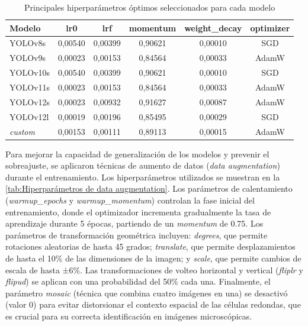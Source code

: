 \documentclass[12pt,a4paper,onecolumn,oneside]{report}
\begin{document}
\begin{table}[H]
\caption{Principales hiperparámetros óptimos seleccionados para cada modelo}
\label{tab:Principales hiperparámetros óptimos seleccionados para cada modelo}
\centering
\begin{tabular}{lccccc}
\toprule
\textbf{Modelo} & \textbf{lr0} & \textbf{lrf} & \textbf{momentum} & \textbf{weight\_decay} & \textbf{optimizer} \\
\midrule
YOLOv8s   & 0,00540 & 0,00399 & 0,90621 & 0,00010 & SGD \\
YOLOv9s   & 0,00023 & 0,00153 & 0,84564 & 0,00033 & AdamW \\
YOLOv10s  & 0,00540 & 0,00399 & 0,90621 & 0,00010 & SGD \\
YOLOv11s  & 0,00023 & 0,00153 & 0,84564 & 0,00033 & AdamW \\
YOLOv12s  & 0,00023 & 0,00932 & 0,91627 & 0,00087 & AdamW \\
YOLOv12l  & 0,00019 & 0,00196 & 0,85495 & 0,00029 & SGD \\
\textit{custom}    & 0,00153 & 0,00111 & 0,89113 & 0,00015 & AdamW \\
\bottomrule
\end{tabular}
\end{table}

Para mejorar la capacidad de generalización de los modelos y prevenir el sobreajuste, se aplicaron técnicas de aumento de datos (\textit{data augmentation}) 
durante el entrenamiento. Los hiperparámetros utilizados se muestran en la \autoref{tab:Hiperparámetros de data augmentation}. Los parámetros de calentamiento 
(\textit{warmup\_epochs} y \textit{warmup\_momentum}) controlan la fase inicial del entrenamiento, donde el optimizador incrementa gradualmente la tasa de 
aprendizaje durante 5 épocas, partiendo de un \textit{momentum} de 0.75. Los parámetros de transformación geométrica incluyen: \textit{degrees}, que permite rotaciones 
aleatorias de hasta 45 grados; \textit{translate}, que permite desplazamientos de hasta el 10\% de las dimensiones de la imagen; y \textit{scale}, que permite 
cambios de escala de hasta ±6\%. Las transformaciones de volteo horizontal y vertical (\textit{fliplr} y \textit{flipud}) se aplican con una probabilidad del 50\% 
cada una. Finalmente, el parámetro \textit{mosaic} (técnica que combina cuatro imágenes en una) se desactivó (valor 0) para evitar distorsionar el contexto 
espacial de las células redondas, que es crucial para su correcta identificación en imágenes microscópicas.
\end{document}
